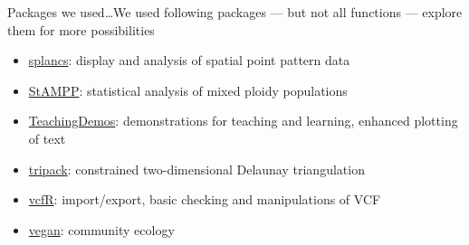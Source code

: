 \documentclass[compress, xelatex, 11pt, xcolor=svgnames, aspectratio=169, url={hyphens, lowtilde}]{beamer}
\begin{document}
\begin{frame}[allowframebreaks]{Packages we used\ldots}{We used following packages --- but not all functions --- explore them for more possibilities}
\begin{itemize}
		\item \href{https://CRAN.R-project.org/package=splancs}{splancs}: display and analysis of spatial point pattern data
		\item \href{https://CRAN.R-project.org/package=StAMPP}{StAMPP}: statistical analysis of mixed ploidy populations
		\item \href{https://CRAN.R-project.org/package=TeachingDemos}{TeachingDemos}: demonstrations for teaching and learning, enhanced plotting of text
		\item \href{https://CRAN.R-project.org/package=tripack}{tripack}: constrained two-dimensional Delaunay triangulation
		\item \href{https://CRAN.R-project.org/package=vcfR}{vcfR}: import/export, basic checking and manipulations of VCF
		\item \href{https://CRAN.R-project.org/package=vegan}{vegan}: community ecology
	\end{itemize}
\end{frame}
\end{document}

